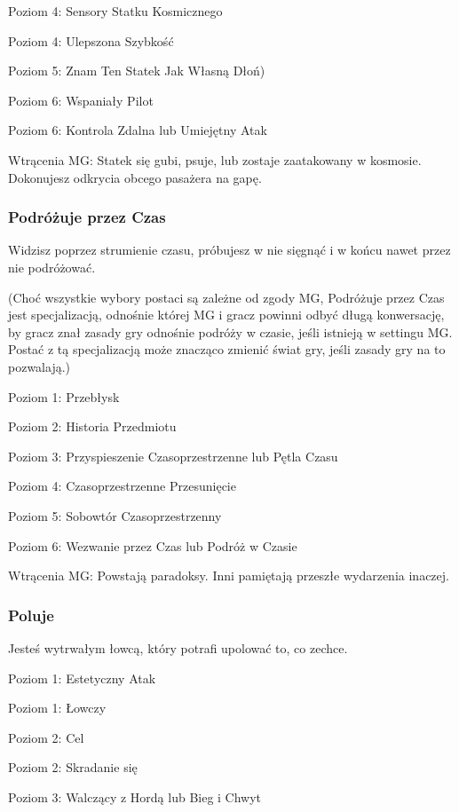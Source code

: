 Poziom 4: Sensory Statku Kosmicznego

Poziom 4: Ulepszona Szybkość

Poziom 5: Znam Ten Statek Jak Własną Dłoń)

Poziom 6: Wspaniały Pilot

Poziom 6: Kontrola Zdalna lub Umiejętny Atak

Wtrącenia MG: Statek się gubi, psuje, lub zostaje zaatakowany w kosmosie. Dokonujesz odkrycia obcego pasażera na gapę. 

\subsubsection{Podróżuje przez Czas}

Widzisz poprzez strumienie czasu, próbujesz w nie sięgnąć i w końcu nawet przez nie podróżować. 

(Choć wszystkie wybory postaci są zależne od zgody MG, Podróżuje przez Czas jest specjalizacją, odnośnie której MG i gracz powinni odbyć długą konwersację, by gracz znał zasady gry odnośnie podróży w czasie, jeśli istnieją w settingu MG. Postać z tą 
specjalizacją może znacząco zmienić świat gry, jeśli zasady gry na to pozwalają.) 

Poziom 1: Przebłysk

Poziom 2: Historia Przedmiotu

Poziom 3: Przyspieszenie Czasoprzestrzenne lub Pętla Czasu

Poziom 4: Czasoprzestrzenne Przesunięcie

Poziom 5: Sobowtór Czasoprzestrzenny

Poziom 6: Wezwanie przez Czas lub Podróż w Czasie

Wtrącenia MG: Powstają paradoksy. Inni pamiętają przeszłe wydarzenia inaczej.

\subsubsection{Poluje}

Jesteś wytrwałym łowcą, który potrafi upolować to, co zechce.

Poziom 1: Estetyczny Atak

Poziom 1: Łowczy

Poziom 2: Cel

Poziom 2: Skradanie się

Poziom 3: Walczący z Hordą lub Bieg i Chwyt

